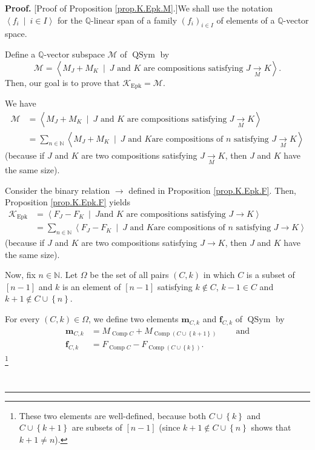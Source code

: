 \documentclass[numbers=enddot,12pt,final,onecolumn,notitlepage]{scrartcl}%
\theoremstyle{definition}
\newenvironment{proof}[1][Proof]{\noindent\textbf{#1.} }{\ \rule{0.5em}{0.5em}}
\let\sumnonlimits\sum
\renewcommand{\sum}{\sumnonlimits\limits}
\begin{document}
\begin{proof}
[Proof of Proposition \ref{prop.K.Epk.M}.]We shall use the notation
$\left\langle f_{i}\ \mid\ i\in I\right\rangle $ for the $\mathbb{Q}$-linear
span of a family $\left(  f_{i}\right)  _{i\in I}$ of elements of a
$\mathbb{Q}$-vector space.

Define a $\mathbb{Q}$-vector subspace $\mathcal{M}$ of $\operatorname*{QSym}$
by%
\[
\mathcal{M}=\left\langle M_{J}+M_{K}\ \mid\ J\text{ and }K\text{ are
compositions satisfying }J\underset{M}{\rightarrow}K\right\rangle .
\]
Then, our goal is to prove that $\mathcal{K}_{\operatorname*{Epk}}%
=\mathcal{M}$.

We have%
\begin{align*}
\mathcal{M}  &  =\left\langle M_{J}+M_{K}\ \mid\ J\text{ and }K\text{ are
compositions satisfying }J\underset{M}{\rightarrow}K\right\rangle \\
&  =\sum_{n\in\mathbb{N}}\left\langle M_{J}+M_{K}\ \mid\ J\text{ and }K\text{
are compositions of }n\text{ satisfying }J\underset{M}{\rightarrow
}K\right\rangle
\end{align*}
(because if $J$ and $K$ are two compositions satisfying
$J\underset{M}{\rightarrow}K$, then $J$ and $K$ have the same size).

Consider the binary relation $\rightarrow$ defined in Proposition
\ref{prop.K.Epk.F}. Then, Proposition \ref{prop.K.Epk.F} yields%
\begin{align*}
\mathcal{K}_{\operatorname*{Epk}}  &  =\left\langle F_{J}-F_{K}\ \mid\ J\text{
and }K\text{ are compositions satisfying }J\rightarrow K\right\rangle \\
&  =\sum_{n\in\mathbb{N}}\left\langle F_{J}-F_{K}\ \mid\ J\text{ and }K\text{
are compositions of }n\text{ satisfying }J\rightarrow K\right\rangle
\end{align*}
(because if $J$ and $K$ are two compositions satisfying $J\rightarrow K$, then
$J$ and $K$ have the same size).

Now, fix $n\in\mathbb{N}$. Let $\Omega$ be the set of all pairs $\left(
C,k\right)  $ in which $C$ is a subset of $\left[  n-1\right]  $ and $k$ is an
element of $\left[  n-1\right]  $ satisfying $k\notin C$, $k-1\in C$ and
$k+1\notin C\cup\left\{  n\right\}  $.

For every $\left(  C,k\right)  \in\Omega$, we define two elements
$\mathbf{m}_{C,k}$ and $\mathbf{f}_{C,k}$ of $\operatorname*{QSym}$ by%
\begin{align}
\mathbf{m}_{C,k}  &  =M_{\operatorname*{Comp}C}+M_{\operatorname*{Comp}\left(
C\cup\left\{  k+1\right\}  \right)  }\ \ \ \ \ \ \ \ \ \ \text{and}%
\label{pf.prop.K.Epk.M.mCk=}\\
\mathbf{f}_{C,k}  &  =F_{\operatorname*{Comp}C}-F_{\operatorname*{Comp}\left(
C\cup\left\{  k\right\}  \right)  }. \label{pf.prop.K.Epk.M.fCk=}%
\end{align}
\footnote{These two elements are well-defined, because both $C\cup\left\{
k\right\}  $ and $C\cup\left\{  k+1\right\}  $ are subsets of $\left[
n-1\right]  $ (since $k+1\notin C\cup\left\{  n\right\}  $ shows that $k+1\neq
n$).}


\end{proof}
\end{document}
